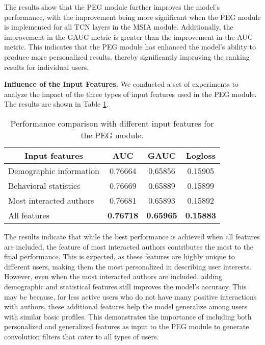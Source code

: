 The results show that the PEG module further improves the model's performance, with the improvement being more significant when the PEG module is implemented for all TCN layers in the MSIA module. Additionally, the improvement in the GAUC metric is greater than the improvement in the AUC metric. This indicates that the PEG module has enhanced the model's ability to produce more personalized results, thereby significantly improving the ranking results for individual users.

\textbf{Influence of the Input Features.} We conducted a set of experiments to analyze the impact of the three types of input features used in the PEG module. The results are shown in Table \ref{tab:PEG_inputFea}.

\begin{table}[t]
    \centering
    \caption{Performance comparison with different input features for the PEG module. }
    \begin{tabular}{cccc}
    \toprule
     Input features & AUC & GAUC & Logloss \\
    \midrule
    \multicolumn{1}{l|}{Demographic information} & 0.76664 & 0.65856 & 0.15905 \\
    \midrule
    \multicolumn{1}{l|}{Behavioral statistics} & 0.76669 & 0.65889 & 0.15899 \\
    \midrule
    \multicolumn{1}{l|}{Most interacted authors} & 0.76681 & 0.65893 & 0.15892 \\
    \midrule
    \multicolumn{1}{l|}{All features} & \textbf{0.76718} & \textbf{0.65965} & \textbf{0.15883} \\
    \bottomrule
    \end{tabular}
\label{tab:PEG_inputFea}
\vspace{-0.3cm}
\end{table}

The results indicate that while the best performance is achieved when all features are included, the feature of most interacted authors contributes the most to the final performance. This is expected, as these features are highly unique to different users, making them the most personalized in describing user interests. However, even when the most interacted authors are included, adding demographic and statistical features still improves the model's accuracy. This may be because, for less active users who do not have many positive interactions with authors, these additional features help the model generalize among users with similar basic profiles. This demonstrates the importance of including both personalized and generalized features as input to the PEG module to generate convolution filters that cater to all types of users. 

